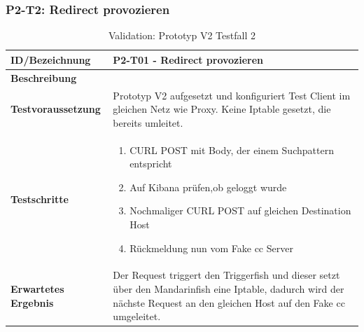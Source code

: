 \begin{table}[H]
\subsubsection{P2-T2: Redirect provozieren}
    \centering
	\begin{tabularx}{\textwidth}{| l | p{} |}
        \hline
        \textbf{ID/Bezeichnung} & P2-T01 - Redirect provozieren\\ \hline
        \textbf{Beschreibung} &  \\ \hline  
        \textbf{Testvoraussetzung} & Prototyp V2 aufgesetzt und konfiguriert Test Client im gleichen Netz wie Proxy. Keine Iptable gesetzt, die bereits umleitet. \\ \hline      
        \textbf{Testschritte} & \begin{enumerate}
        	\item CURL POST mit Body, der einem Suchpattern entspricht
        	\item Auf Kibana prüfen,ob geloggt wurde
        	\item Nochmaliger CURL POST auf gleichen Destination Host
        	\item Rückmeldung nun vom Fake \gls{cc} Server
        \end{enumerate} \\ \hline    
        \textbf{Erwartetes Ergebnis} & Der Request triggert den Triggerfish und dieser setzt über den Mandarinfish eine Iptable, dadurch wird der nächste Request an den gleichen Host auf den Fake \gls{cc} umgeleitet.\\ \hline      
    \end{tabularx}
    \caption{Validation: Prototyp V2 Testfall 2}
\end{table}



